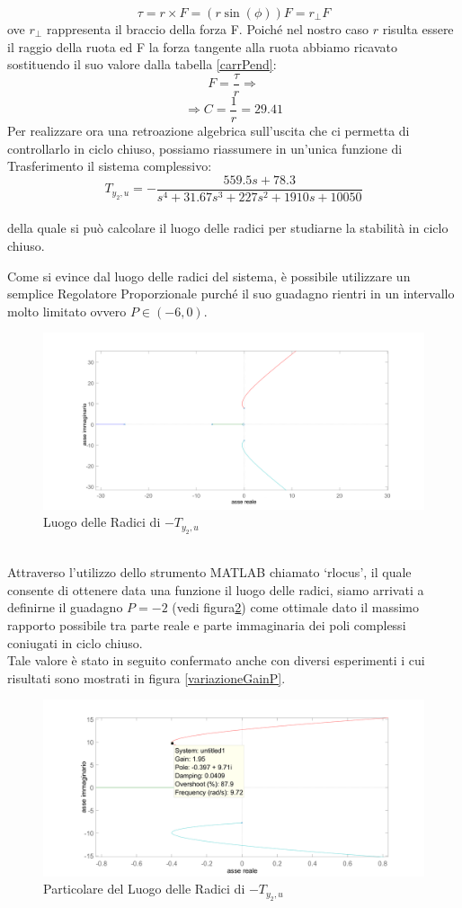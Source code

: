 $$\tau=r\times F=(r\sin(\phi))F=r_{\bot}F$$
ove $r_{\bot}$ rappresenta il braccio della forza F.
Poiché nel nostro caso $r$ risulta essere il raggio della ruota ed F la forza tangente alla ruota abbiamo ricavato sostituendo il suo valore dalla tabella \ref{carrPend}: $$F=\displaystyle\frac{\tau}{r}\Rightarrow$$$$\Rightarrow C=\displaystyle\frac{1}{r}=29.41$$
Per realizzare ora una retroazione algebrica sull'uscita che ci permetta di controllarlo in ciclo chiuso, possiamo riassumere in un'unica funzione di Trasferimento il sistema complessivo:\\
$$T_{y_2,u}=-\displaystyle\frac{559.5s+78.3}{s^4+31.67s^3+227s^2+1910s+10050}$$\\
della quale si può calcolare il luogo delle radici per studiarne la stabilità in ciclo chiuso.

Come si evince dal luogo delle radici del sistema, è possibile utilizzare un semplice Regolatore Proporzionale purché il suo guadagno rientri in un intervallo molto limitato ovvero $P\in(-6,0)$.
\begin{figure}[ht]
	\centering
	\includegraphics[width=\textwidth]{RLocusPendoloNormale.PNG}
	\caption{Luogo delle Radici di $-T_{y_2,u}$}
	\label{RLocusPendoloNormale}
\end{figure}
\\Attraverso l'utilizzo dello strumento MATLAB chiamato `rlocus', il quale consente di ottenere data una funzione il luogo delle radici, siamo arrivati a definirne il guadagno $P=-2$ (vedi figura\ref{gainOttimaleft}) come ottimale dato il massimo rapporto possibile tra parte reale e parte immaginaria dei poli complessi coniugati in ciclo chiuso.\\
Tale valore è stato in seguito confermato anche con diversi esperimenti i cui risultati sono mostrati in figura \ref{variazioneGainP}.
\begin{figure}[ht]
	\centering
	\includegraphics[width=\textwidth]{gainOttimaleft.PNG}
	\caption{Particolare del Luogo delle Radici di $-T_{y_2,u}$}
	\label{gainOttimaleft}
\end{figure}
